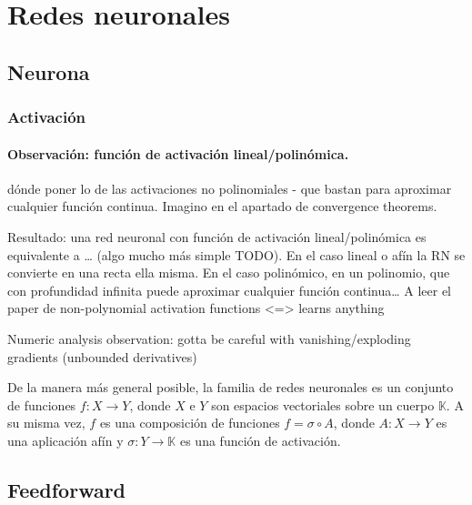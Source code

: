 \hypertarget{redes-neuronales}{%
\section{Redes neuronales}\label{redes-neuronales}}

\hypertarget{neurona}{%
\subsection{Neurona}\label{neurona}}

\hypertarget{activaciuxf3n}{%
\subsubsection{Activación}\label{activaciuxf3n}}

\hypertarget{observaciuxf3n-funciuxf3n-de-activaciuxf3n-linealpolinuxf3mica.}{%
\paragraph{Observación: función de activación
lineal/polinómica.}\label{observaciuxf3n-funciuxf3n-de-activaciuxf3n-linealpolinuxf3mica.}}

dónde poner lo de las activaciones no polinomiales - que bastan para
aproximar cualquier función continua. Imagino en el apartado de
convergence theorems.

Resultado: una red neuronal con función de activación lineal/polinómica
es equivalente a \ldots{} (algo mucho más simple TODO). En el caso
lineal o afín la RN se convierte en una recta ella misma. En el caso
polinómico, en un polinomio, que con profundidad infinita puede
aproximar cualquier función continua\ldots{} A leer el paper de
non-polynomial activation functions \textless=\textgreater{} learns
anything

Numeric analysis observation: gotta be careful with vanishing/exploding
gradients (unbounded derivatives)

De la manera más general posible, la familia de redes neuronales es un
conjunto de funciones \(f: X \to Y\), donde \(X\) e \(Y\) son espacios
vectoriales sobre un cuerpo \(\mathbb{K}\). A su misma vez, \(f\) es una
composición de funciones \(f = \sigma \circ A\), donde \(A: X \to Y\) es
una aplicación afín y \(\sigma: Y \to \mathbb{K}\) es una función de
activación.

\hypertarget{feedforward}{%
\subsection{Feedforward}\label{feedforward}}

